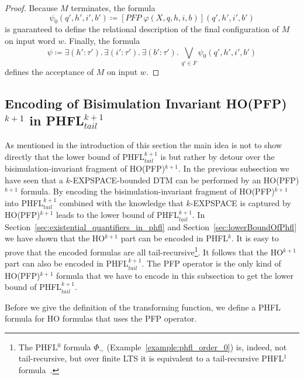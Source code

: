 \begin{proof}
    Because $M$ terminates, the formula
    \[\psi_0(q', h', i', b') \coloneqq [\mathit{PFP}\;\varphi(X, q, h, i, b)](q', h', i', b') \]
    is guaranteed to define the relational description of the final configuration of $M$ on input word $w$.
    Finally, the formula
    \[\psi \coloneqq \exists (h' \colon \tau').\, \exists (i' \colon \tau').\, \exists (b' \colon \tau').\,
    \underset{q' \in F}{\bigvee} \psi_0(q', h', i', b')\]
    defines the acceptance of $M$ on input $w$.
\end{proof}

\subsection{Encoding of Bisimulation Invariant HO(PFP)$^{k+1}$ in PHFL$^{k+1}_{tail}$}\label{subsec:bisimulationInvariantHopfptoPhfl}

As mentioned in the introduction of this section the main idea is not to show directly that the 
lower bound of PHFL$^{k+1}_{tail}$ is  but rather by detour over the 
bisimulation-invariant fragment of HO(PFP)$^{k+1}$. In the previous subsection we have seen 
 that a $k$-EXPSPACE-bounded DTM can be performed by an HO(PFP)$^{k+1}$
formula. By encoding the bisimulation-invariant fragment of HO(PFP)$^{k+1}$ into
PHFL$^{k+1}_{tail}$ combined with the knowledge that $k$-EXPSPACE is captured by 
HO(PFP)$^{k+1}$ leads to the lower bound of PHFL$^{k+1}_{tail}$. In
Section~\ref{sec:existential_quantifiers_in_phfl} and Section~\ref{sec:lowerBoundOfPhfl} we 
have shown that the HO$^{k+1}$ part can be encoded in PHFL$^k$. It is easy to prove that the 
encoded formulas are all tail-recursive\footnote{The PHFL$^0$ formula $\Phi_\sim$ (Example~\ref{example:phfl_order_0}) is, indeed, not tail-recursive, but over finite LTS it is equivalent to a tail-recursive PHFL$^1$ formula~\cite{lange2014capturing_long}.}. It follows that the HO$^{k+1}$ part can also be 
encoded in  PHFL$^{k+1}_{tail}$. The PFP operator is the only kind of HO(PFP)$^{k+1}$ formula 
that we have to encode in this subsection to get the lower bound of PHFL$^{k+1}_{tail}$.

Before we give the definition of the transforming function, we define a PHFL formula for HO formulas that uses the PFP operator.

